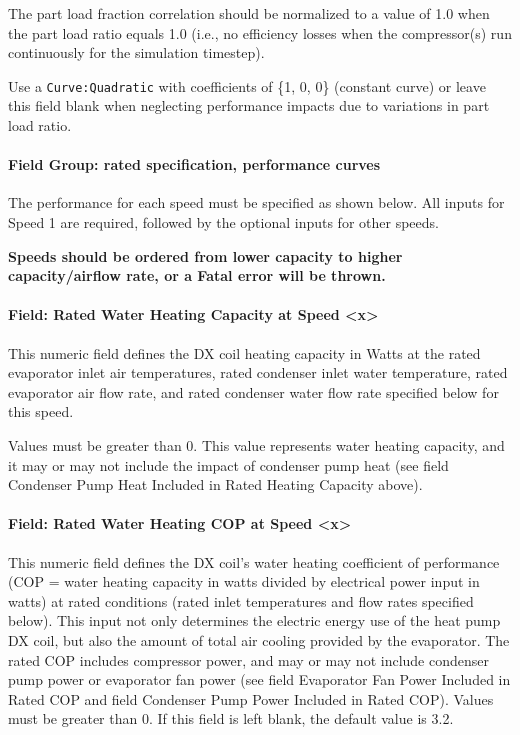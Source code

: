 The part load fraction correlation should be normalized to a value of 1.0 when the part load ratio equals 1.0 (i.e., no efficiency losses when the compressor(s) run continuously for the simulation timestep).

Use a \lstinline!Curve:Quadratic! with coefficients of \{1, 0, 0\} (constant curve) or leave this field blank when neglecting performance impacts due to variations in part load ratio.

\paragraph{Field Group: rated specification, performance curves}\label{field-group-rated-specification-performance-curves-and-waste-heat-data-x}

The performance for each speed must be specified as shown below.
All inputs for Speed 1 are required, followed by the optional inputs for other speeds.

\textbf{Speeds should be ordered from lower capacity to higher capacity/airflow rate, or a Fatal error will be thrown.}


\paragraph{Field: Rated Water Heating Capacity at Speed \textless{}x\textgreater{}}\label{vshpwhheating-rated-water-heating-capacity-at-speed-x}

This numeric field defines the DX coil heating capacity in Watts at the rated evaporator inlet air temperatures, rated condenser inlet water temperature, rated evaporator air flow rate, and rated condenser water flow rate specified below for this speed.

Values must be greater than 0. This value represents water heating capacity, and it may or may not include the impact of condenser pump heat (see field Condenser Pump Heat Included in Rated Heating Capacity above).


\paragraph{Field: Rated Water Heating COP at Speed \textless{}x\textgreater{}}\label{vshpwhheating-rated-water-heating-cop-at-speed-x}

This numeric field defines the DX coil's water heating coefficient of performance (COP = water heating capacity in watts divided by electrical power input in watts) at rated conditions (rated inlet temperatures and flow rates specified below).
This input not only determines the electric energy use of the heat pump DX coil, but also the amount of total air cooling provided by the evaporator.
The rated COP includes compressor power, and may or may not include condenser pump power or evaporator fan power (see field Evaporator Fan Power Included in Rated COP and field Condenser Pump Power Included in Rated COP). Values must be greater than 0. If this field is left blank, the default value is 3.2.



